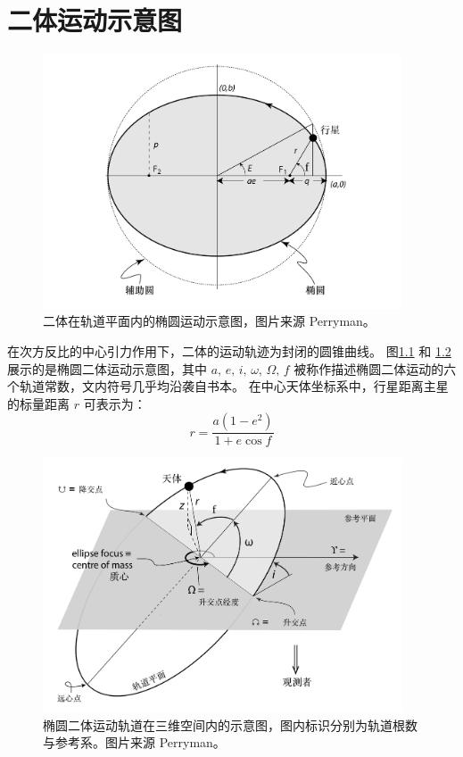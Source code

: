 \chapter{二体运动示意图} \label{apdx:twobodyproblem}

\begin{figure}[h]
\centering
\includegraphics[width=0.95\textwidth]{figures/appendix/f1_ellipse.pdf}
\caption{二体在轨道平面内的椭圆运动示意图，图片来源 Perryman。}
\label{fig:ellipse}
\end{figure}

在次方反比的中心引力作用下，二体的运动轨迹为封闭的圆锥曲线\cite{Newton1687}。
图\ref{fig:ellipse} 和 \ref{fig:3dorbit} 展示的是椭圆二体运动示意图，其中 $a,\,e,\,i,\,\omega,\,\Omega,\,f$ 
被称作描述椭圆二体运动的六个轨道常数，文内符号几乎均沿袭自书本。
在中心天体坐标系中，行星距离主星的标量距离 $r$ 可表示为：
\begin{equation} \label{radialdistance}
r = \frac{a(1-e^2)}{1+e\cos f}
\end{equation} %

\begin{figure}[t]
\centering
\includegraphics[width=0.95\textwidth]{figures/appendix/f2_3dorbit.pdf}
\caption{椭圆二体运动轨道在三维空间内的示意图，图内标识分别为轨道根数与参考系。图片来源 Perryman。}
\label{fig:3dorbit}
\end{figure}




